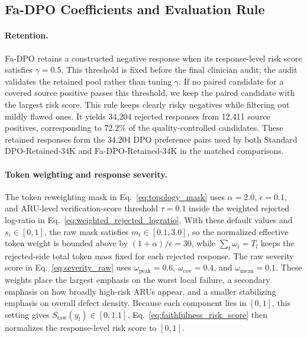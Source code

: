 \documentclass[a4paper,fleqn,doubleblind]{cas-sc}
\begin{document}
\subsection{Fa-DPO Coefficients and Evaluation Rule}

\paragraph{Retention.}
Fa-DPO retains a constructed negative response when its response-level risk score satisfies $\gamma=0.5$.
This threshold is fixed before the final clinician audit; the audit validates the retained pool rather than tuning $\gamma$.
If no paired candidate for a covered source positive passes this threshold, we keep the paired candidate with the largest risk score.
This rule keeps clearly risky negatives while filtering out mildly flawed ones.
It yields 34,204 rejected responses from 12,411 source positives, corresponding to 72.2\% of the quality-controlled candidates.
These retained responses form the 34,204 DPO preference pairs used by both Standard DPO-Retained-34K and Fa-DPO-Retained-34K in the matched comparisons.

\paragraph{Token weighting and response severity.}
The token reweighting mask in Eq.~\ref{eq:topology_mask} uses $\alpha=2.0$, $\epsilon=0.1$, and ARU-level verification-score threshold $\tau=0.1$ inside the weighted rejected log-ratio in Eq.~\ref{eq:weighted_rejected_logratio}. With these default values and $s_i\in[0,1]$, the raw mask satisfies $m_t\in[0.1,3.0]$, so the normalized effective token weight is bounded above by $(1+\alpha)/\epsilon=30$, while $\sum_t\omega_t=T_l$ keeps the rejected-side total token mass fixed for each rejected response.
The raw severity score in Eq.~\ref{eq:severity_raw} uses $\omega_{\text{peak}}=0.6$, $\omega_{\text{cov}}=0.4$, and $\omega_{\text{mean}}=0.1$.
These weights place the largest emphasis on the worst local failure, a secondary emphasis on how broadly high-risk ARUs appear, and a smaller stabilizing emphasis on overall defect density.
Because each component lies in $[0,1]$, this setting gives $S_{\text{raw}}(y_l)\in[0,1.1]$.
Eq.~\ref{eq:faithfulness_risk_score} then normalizes the response-level risk score to $[0,1]$.
\end{document}
